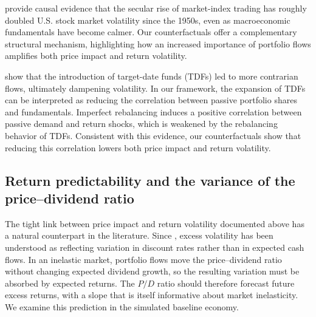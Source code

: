 \documentclass[12pt,english]{article}
\begin{document}
\citet{lochstoerMuir2026} provide causal evidence that the secular rise of market-index trading has roughly doubled U.S. stock market volatility since the 1950s, even as macroeconomic fundamentals have become calmer.
Our counterfactuals offer a complementary structural mechanism, highlighting how an increased importance of portfolio flows amplifies both price impact and return volatility.

\citet{parker2023retail} show that the introduction of target-date funds (TDFs) led to more contrarian flows, ultimately dampening volatility.
In our framework, the expansion of TDFs can be interpreted as reducing the correlation between passive portfolio shares and fundamentals.
Imperfect rebalancing induces a positive correlation between passive demand and return shocks, which is weakened by the rebalancing behavior of TDFs.
Consistent with this evidence, our counterfactuals show that reducing this correlation lowers both price impact and return volatility.


\subsection{Return predictability and the variance of the price--dividend ratio}\label{sec:predictability}

The tight link between price impact and return volatility documented above has a natural counterpart in the literature.
Since \citet{cochrane1992explaining}, excess volatility has been understood as reflecting variation in discount rates rather than in expected cash flows.
In an inelastic market, portfolio flows move the price--dividend ratio without changing expected dividend growth, so the resulting variation must be absorbed by expected returns.
The $P/D$ ratio should therefore forecast future excess returns, with a slope that is itself informative about market inelasticity.
We examine this prediction in the simulated baseline economy.
\end{document}
